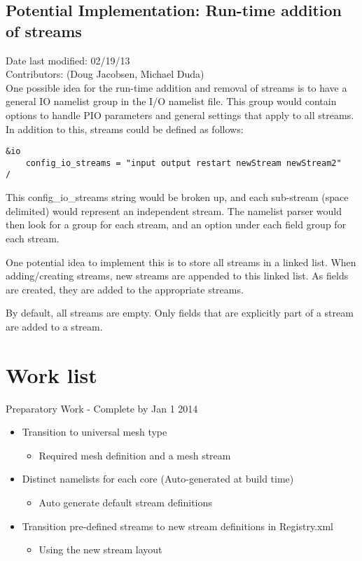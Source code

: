 \documentclass[11pt]{report}
\begin{document}
\section{Potential Implementation: Run-time addition of streams}
Date last modified: 02/19/13 \\
Contributors: (Doug Jacobsen, Michael Duda) \\

One possible idea for the run-time addition and removal of streams is to have a
general IO namelist group in the I/O namelist file. This group would contain
options to handle PIO parameters and general settings that apply to all
streams. In addition to this, streams could be defined as follows:

\begin{lstlisting}
&io
	config_io_streams = "input output restart newStream newStream2"
/
\end{lstlisting}

This config\_io\_streams string would be broken up, and each sub-stream (space
delimited) would represent an independent stream. The namelist parser would then look
for a group for each stream, and an option under each field group for each
stream.

One potential idea to implement this is to store all streams in a linked list.
When adding/creating streams, new streams are appended to this linked list.  As
fields are created, they are added to the appropriate streams.

By default, all streams are empty. Only fields that are explicitly part of a
stream are added to a stream.


\chapter{Work list}
Preparatory Work - Complete by Jan 1 2014
\begin{itemize}
	\item Transition to universal mesh type
	\begin{itemize}
		\item Required mesh definition and a mesh stream
	\end{itemize}
	\item Distinct namelists for each core (Auto-generated at build time)
	\begin{itemize}
		\item Auto generate default stream definitions
	\end{itemize}
	\item Transition pre-defined streams to new stream definitions in Registry.xml 
	\begin{itemize}
		\item Using the new stream layout
	\end{itemize}
\end{itemize}
\end{document}
